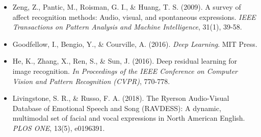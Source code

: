\documentclass{article}
\begin{document}
\begin{itemize}
    \item Zeng, Z., Pantic, M., Roisman, G. I., \& Huang, T. S. (2009). A survey of affect recognition methods: Audio, visual, and spontaneous expressions. \textit{IEEE Transactions on Pattern Analysis and Machine Intelligence}, 31(1), 39-58.
    \item Goodfellow, I., Bengio, Y., \& Courville, A. (2016). \textit{Deep Learning}. MIT Press.
    \item He, K., Zhang, X., Ren, S., \& Sun, J. (2016). Deep residual learning for image recognition.  \textit{In Proceedings of the IEEE Conference on Computer Vision and Pattern Recognition (CVPR)}, 770-778.
    \item Livingstone, S. R., \& Russo, F. A. (2018). The Ryerson Audio-Visual Database of Emotional Speech and Song (RAVDESS): A dynamic, multimodal set of facial and vocal expressions in North American English. \textit{PLOS ONE}, 13(5), e0196391.
\end{itemize}
\end{document}
